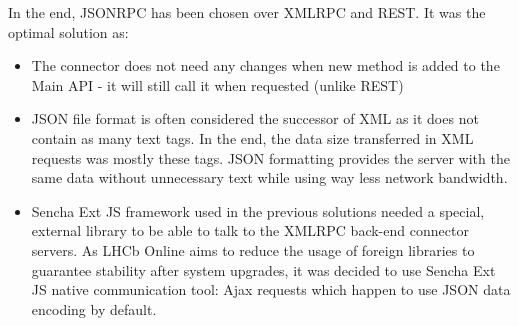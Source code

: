\documentclass{customization}
\begin{document}
\noindent
In the end, JSONRPC has been chosen over XMLRPC and REST. It was the optimal solution as:

\begin{itemize}
    \item The connector does not need any changes when new method is added to the Main API - it will still call it when requested (unlike REST)
    \item JSON file format is often considered the successor of XML as it does not contain as many text tags. In the end, the data size transferred in XML requests was mostly these tags. JSON formatting provides the server with the same data without unnecessary text while using way less network bandwidth.
    \item Sencha Ext JS framework used in the previous solutions needed a special, external library to be able to talk to the XMLRPC back-end connector servers. As LHCb Online aims to reduce the usage of foreign libraries to guarantee stability after system upgrades, it was decided to use Sencha Ext JS native communication tool: Ajax requests which happen to use JSON data encoding by default.
\end{itemize}

\end{document}
